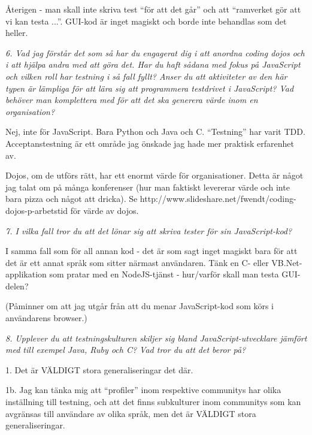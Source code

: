 \documentclass[11pt]{article}
\begin{document}
Återigen - man skall inte skriva test ``för att det går'' och att
``ramverket gör att vi kan testa ...''. GUI-kod är inget magiskt och borde
inte behandlas som det heller.

\emph{6. Vad jag förstår det som så har du engagerat dig i att anordna coding
dojos och i att hjälpa andra med att göra det. Har du haft sådana med
fokus på JavaScript och vilken roll har testning i så fall fyllt?
Anser du att aktiviteter av den här typen är lämpliga för att lära sig
att programmera testdrivet i JavaScript? Vad behöver man komplettera
med för att det ska generera värde inom en organisation?}

Nej, inte för JavaScript. Bara Python och Java och C\nolinebreak\hspace{-.05em}\raisebox{.3ex}{\scriptsize\bf \#}. ``Testning'' har varit TDD.
Acceptanstestning är ett område jag önskade jag hade mer praktisk
erfarenhet av.

Dojos, om de utförs rätt, har ett enormt värde för organisationer. Detta
är något jag talat om på många konferenser (hur man faktiskt levererar
värde och inte bara pizza och något att dricka).
Se http://www.slideshare.net/fwendt/coding-dojos-p-arbetstid för värde av
dojos.

\emph{7. I vilka fall tror du att det lönar sig att skriva tester för sin
JavaScript-kod?}

I samma fall som för all annan kod - det är som sagt inget magiskt bara
för att det är ett annat språk som sitter närmast användaren. Tänk en
C\nolinebreak\hspace{-.05em}\raisebox{.3ex}{\scriptsize\bf \#}- eller
VB.Net-applikation som pratar med en NodeJS-tjänst -
hur/varför skall man testa GUI-delen?

(Påminner om att jag utgår från att du menar JavaScript-kod som körs i
användarens browser.)

\emph{8. Upplever du att testningskulturen skiljer sig bland
JavaScript-utvecklare jämfört med till exempel Java, Ruby och C\nolinebreak\hspace{-.05em}\raisebox{.3ex}{\scriptsize\bf \#}? Vad
tror du att det beror på?}

1. Det är VÄLDIGT stora generaliseringar det där.

1b. Jag kan tänka mig att ``profiler'' inom respektive communitys har
olika inställning till testning, och att det finns subkulturer inom
communitys som kan avgränsas till användare av olika språk, men det är
VÄLDIGT stora generaliseringar.
\end{document}
